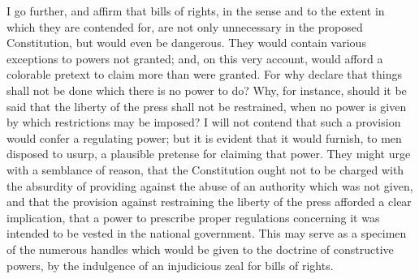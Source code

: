 I go further, and affirm that bills of rights, in the sense and to the extent in which they are contended for, are not only unnecessary in the proposed Constitution, but would even be dangerous. 
They would contain various exceptions to powers not granted; and, on this very account, would afford a colorable pretext to claim more than were granted. 
For why declare that things shall not be done which there is no power to do? 
Why, for instance, should it be said that the liberty of the press shall not be restrained, when no power is given by which restrictions may be imposed? 
I will not contend that such a provision would confer a regulating power; but it is evident that it would furnish, to men disposed to usurp, a plausible pretense for claiming that power. 
They might urge with a semblance of reason, that the Constitution ought not to be charged with the absurdity of providing against the abuse of an authority which was not given, and that the provision against restraining the liberty of the press afforded a clear implication, that a power to prescribe proper regulations concerning it was intended to be vested in the national government. 
This may serve as a specimen of the numerous handles which would be given to the doctrine of constructive powers, by the indulgence of an injudicious zeal for bills of rights.

